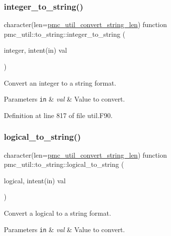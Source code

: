 \subsubsection{\texorpdfstring{integer\+\_\+to\+\_\+string()}{integer\_to\_string()}}
{\footnotesize\ttfamily character(len=\mbox{\hyperlink{namespacepmc__util_afd468d26aef28509c08087ba8e59089a}{pmc\+\_\+util\+\_\+convert\+\_\+string\+\_\+len}}) function pmc\+\_\+util\+::to\+\_\+string\+::integer\+\_\+to\+\_\+string (\begin{DoxyParamCaption}\item[{integer, intent(in)}]{val }\end{DoxyParamCaption})}



Convert an integer to a string format. 


\begin{DoxyParams}[1]{Parameters}
\mbox{\tt in}  & {\em val} & Value to convert. \\
\hline
\end{DoxyParams}


Definition at line 817 of file util.\+F90.

\mbox{\label{interfacepmc__util_1_1to__string_a61e5236b08685163304f6f8cdec8a13a}} 
\subsubsection{\texorpdfstring{logical\+\_\+to\+\_\+string()}{logical\_to\_string()}}
{\footnotesize\ttfamily character(len=\mbox{\hyperlink{namespacepmc__util_afd468d26aef28509c08087ba8e59089a}{pmc\+\_\+util\+\_\+convert\+\_\+string\+\_\+len}}) function pmc\+\_\+util\+::to\+\_\+string\+::logical\+\_\+to\+\_\+string (\begin{DoxyParamCaption}\item[{logical, intent(in)}]{val }\end{DoxyParamCaption})}



Convert a logical to a string format. 


\begin{DoxyParams}[1]{Parameters}
\mbox{\tt in}  & {\em val} & Value to convert. \\
\hline
\end{DoxyParams}


